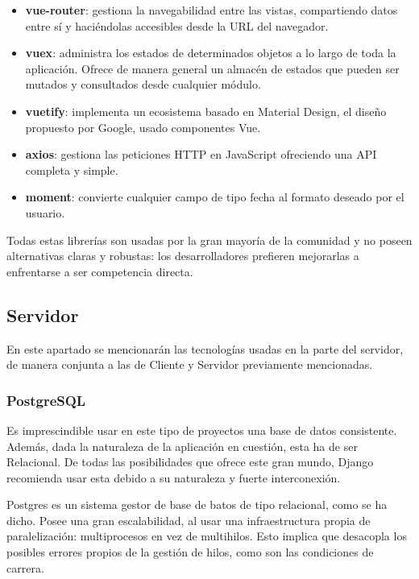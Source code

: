 \begin{itemize}
    \item \textbf{vue-router}: gestiona la navegabilidad entre las vistas, compartiendo datos entre sí y haciéndolas accesibles desde la URL del navegador.
    \item \textbf{vuex}: administra los estados de determinados objetos a lo largo de toda la aplicación. Ofrece de manera general un almacén de estados que pueden ser mutados y consultados desde cualquier módulo.
    \item \textbf{vuetify}: implementa un ecosistema basado en Material Design, el diseño propuesto por Google, usado componentes Vue.
    \item \textbf{axios}: gestiona las peticiones HTTP en JavaScript ofreciendo una API completa y simple.
    \item \textbf{moment}: convierte cualquier campo de tipo fecha al formato deseado por el usuario.
\end{itemize}

Todas estas librerías son usadas por la gran mayoría de la comunidad y no poseen alternativas claras y robustas: los desarrolladores prefieren mejorarlas a enfrentarse a ser competencia directa.

\subsection{Servidor}

En este apartado se mencionarán las tecnologías usadas en la parte del servidor, de manera conjunta a las de Cliente y Servidor previamente mencionadas.

\subsubsection{PostgreSQL}

Es imprescindible usar en este tipo de proyectos una base de datos consistente. Además, dada la naturaleza de la aplicación en cuestión, esta ha de ser Relacional. De todas las posibilidades que ofrece este gran mundo, Django recomienda usar esta debido a su naturaleza y fuerte interconexión.

Postgres es un sistema gestor de base de batos de tipo relacional, como se ha dicho. Posee una gran escalabilidad, al usar una infraestructura propia de paralelización: multiprocesos en vez de multihilos. Esto implica que desacopla los posibles errores propios de la gestión de hilos, como son las condiciones de carrera.


